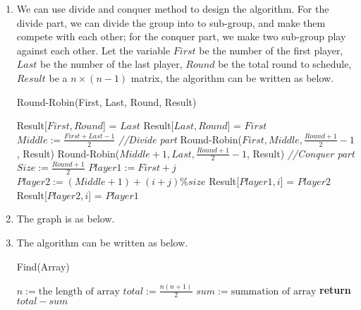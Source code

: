 \documentclass[a4paper,12pt]{article}
\begin{document}
\begin{enumerate}

\item {
We can use divide and conquer method to design the algorithm. For the divide part, we can divide the group into to sub-group, and make them compete with each other; for the conquer part, we make two sub-group play against each other. Let the variable $First$ be the number of the first player, $Last$ be the number of the last player, $Round$ be the total round to schedule, $Result$ be a $n \times (n-1)$ matrix, the algorithm can be written as below.
\begin{algorithm}
	\caption{Round-Robin(First, Last, Round, Result)} 
	\begin{algorithmic}[1]
	        \State Result[$First,Round$] = $Last$
	        \State Result[$Last,Round$] = $First$
	    \Else{}
	        \State $Middle := \frac{First + Last - 1}{2}$
	        \State \textit{//Divide part}
	        \State Round-Robin($First, Middle, \frac{Round+1}{2} - 1$, Result)
	        \State Round-Robin($Middle+1, Last, \frac{Round+1}{2} - 1$, Result)
	        \State \textit{//Conquer part}
	                \State $Size := \frac{Round+1}{2}$ 
	                \State $Player1 := First + j$
	                \State $Player2 := (Middle + 1) + (i + j) \% size$
	                \State Result[$Player1, i$] = $Player2$
	                \State Result[$Player2, i$] = $Player1$
	            \EndFor
	        \EndFor
	   \EndIf
	\end{algorithmic} 
\end{algorithm}
}

\item{ The graph is as below.

\begin{center}
\end{center}


}

\item {
The algorithm can be written as below. 
\begin{algorithm}
	\caption{Find(Array)} 
	\begin{algorithmic}[1]
	    \State $n := \text{the length of array}$
	    \State $total := \frac{n(n+1)}{2}$
	    \State $sum := \text{summation of array}$
	    \State \textbf{return} $total - sum$
	\end{algorithmic} 
\end{algorithm}

}
\end{enumerate}
\end{document}
